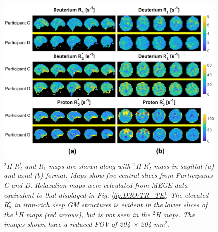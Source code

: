 \begin{figure}[H]
    \centering
    \includegraphics[width=1\textwidth]{Figures/D2O/R1_R2.png}
    \caption{\textit{$^2$H R$_2^*$ and R$_1$ maps are shown along with $^1$H R$_2^*$ maps in sagittal (a) and axial (b) format. Maps show five central slices from Participants C and D. Relaxation maps were calculated from MEGE data equivalent to that displayed in Fig. \ref{fig:D2O:TR_TE}. The elevated R$_2^*$ in iron-rich deep GM structures is evident in the lower slices of the $^1$H maps (red arrows), but is not seen in the $^2$H maps. The images shown have a reduced FOV of 204 × 204 mm$^2$.}}
    \label{fig:D2O:R1_R2}
\end{figure}

